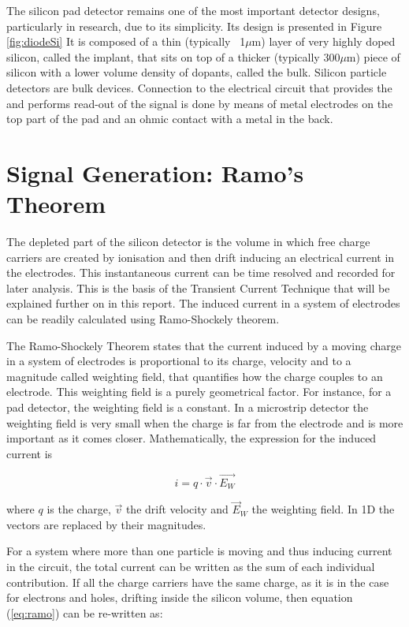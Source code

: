 The silicon pad detector remains one of the most important detector designs,
particularly in research, due to its simplicity. Its design is presented in Figure \ref{fig:diodeSi} It is composed of a thin
(typically ~1$\mu$m) layer of very highly doped silicon, called the implant,
that sits on top of a thicker (typically 300$\mu$m) piece of silicon with a
lower volume density of dopants, called the bulk. Silicon particle detectors are
bulk devices. Connection to the electrical circuit that provides the \vias and
performs read-out of the signal is done by means of metal electrodes on the top
part of the pad and an ohmic contact with a metal in the back. 

\section{Signal Generation: Ramo's Theorem} %
\label{sec:Ramo}

The depleted part of the silicon detector is the volume in which free
charge carriers are created by ionisation and then drift inducing an electrical
current in the electrodes. This instantaneous current can be time resolved and
recorded for later analysis. This is the basis of the Transient Current
Technique that will be explained further on in this report. The induced current
in a system of electrodes can be readily calculated using Ramo-Shockely theorem.


The Ramo-Shockely Theorem states that the current induced by a moving charge in
a system of electrodes is proportional to its charge, velocity and to a
magnitude called weighting field, that quantifies how the charge couples to an
electrode. This weighting field is a purely geometrical factor. For instance,
for a pad detector, the weighting field is a constant. In a microstrip detector
the weighting field is very small when the charge is far from the electrode and
is more important as it comes closer. Mathematically, the expression for the
induced current is

\begin{equation}
	i = q \cdot \overrightarrow {v} \cdot \overrightarrow {E_{W}}
	\label{eq:ramo} 
\end{equation} 

where $q$ is the charge, $\overrightarrow {v}$ the drift velocity and $\overrightarrow E_{W}$ the weighting
field. In 1D the vectors are replaced by their magnitudes.

For a system where more than one particle is moving and thus inducing current in
the circuit, the total current can be written as the sum of each individual
contribution. If all the charge carriers have the same charge, as it is in the
case for electrons and holes, drifting inside the silicon volume, then equation
(\ref{eq:ramo}) can be re-written as:

